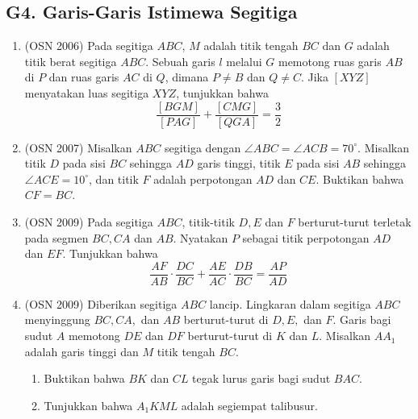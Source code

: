 \documentclass[12pt,a4paper]{article}
\begin{document}
\subsection{G4. Garis-Garis Istimewa Segitiga}
\begin{enumerate}

\item (OSN 2006) Pada segitiga $ABC$, $M$ adalah titik tengah $BC$ dan $G$ adalah titik berat segitiga $ABC$. Sebuah garis $l$ melalui $G$ memotong ruas garis $AB$ di $P$ dan ruas garis $AC$ di $Q$, dimana $P \ne B$ dan $Q \ne C$. Jika $[XYZ]$ menyatakan luas segitiga $XYZ$, tunjukkan bahwa
$$\frac{[BGM]}{[PAG]}+\frac{[CMG]}{[QGA]}=\frac{3}{2}$$

\item (OSN 2007) Misalkan $ABC$ segitiga dengan $\angle ABC=\angle ACB=70^{\circ}$. Misalkan titik $D$ pada sisi $BC$ sehingga $AD$ garis tinggi, titik $E$ pada sisi $AB$ sehingga $\angle ACE=10^{\circ}$, dan titik $F$ adalah perpotongan $AD$ dan $CE$. Buktikan bahwa $CF=BC.$

\item (OSN 2009) Pada segitiga $ABC$, titik-titik $D, E$ dan $F$ berturut-turut terletak pada segmen $BC, CA$ dan $AB$. Nyatakan $P$ sebagai titik perpotongan $AD$ dan $EF$. Tunjukkan bahwa
$$\frac{AF}{AB} \cdot \frac{DC}{BC} + \frac{AE}{AC} \cdot \frac{DB}{BC} = \frac{AP}{AD}$$

\item (OSN 2009) Diberikan segitiga $ABC$ lancip. Lingkaran dalam segitiga $ABC$ menyinggung $BC, CA,$ dan $AB$ berturut-turut di $D, E,$ dan $F$. Garis bagi sudut $A$ memotong $DE$ dan $DF$ berturut-turut di $K$ dan $L$. Misalkan $AA_{1}$ adalah garis tinggi dan $M$ titik tengah $BC$.
\begin{enumerate}
    \item Buktikan bahwa $BK$ dan $CL$ tegak lurus garis bagi sudut $BAC$.
    \item Tunjukkan bahwa $A_{1}KML$ adalah segiempat talibusur.
\end{enumerate}

\end{enumerate}
\end{document}
